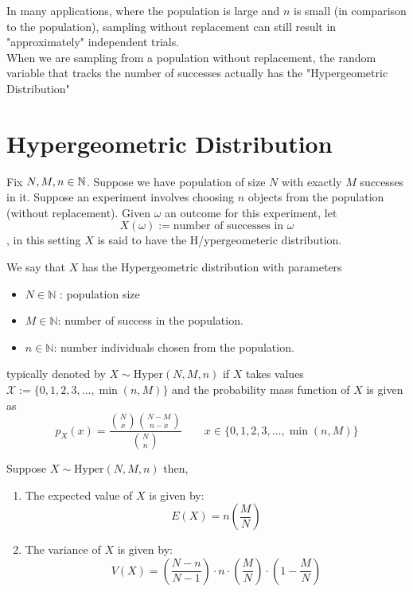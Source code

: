 In many applications, where the population is large and $n$ is small (in comparison to the population), sampling without replacement can still result in "approximately" independent trials.
\\

When we are sampling from a population without replacement, the random variable that tracks the number of successes actually has the "Hypergeometric Distribution"

\section{Hypergeometric Distribution}
Fix $N,M,n\in \mathbb{N}$. Suppose we have population of size $N$ with exactly $M$ successes in it. Suppose an experiment involves choosing $n$ objects from the population (without replacement). Given $\omega$ an outcome for this experiment, let
$$X(\omega) := \text{number of successes in $\omega$}$$, in this setting $X$ is said to have the H/ypergeometeric distribution.


\begin{defn}
    We say that $X$ has the Hypergeometric distribution with parameters
    \begin{itemize}
        \item $N\in \mathbb{N}$ : population size
        \item $M \in \mathbb{N}$: number of success in the population. 
        \item $n\in \mathbb{N}$: number individuals chosen from the population. 
    \end{itemize}
    typically denoted by $X \sim \text{Hyper}(N, M, n)$ if $X$ takes values $\mathcal{X}:= \{0,1, 2, 3, \dots, \min(n, M)\}$ and the probability mass function of $X$ is given as
    $$p_X(x) = \frac{{N \choose x} {N-M \choose n-x}}{{N \choose n}}\quad \quad x\in \{0,1, 2, 3, \dots, \min(n, M)\}$$
\end{defn}

\begin{thm}
    Suppose $X\sim \text{Hyper}(N, M, n)$ then,
    \begin{enumerate}
        \item The expected value of $X$ is given by:
        $$E(X) = n \left(\frac{M}{N}\right)$$
        \item The variance of $X$ is given by:
        $$V(X) = \left(\frac{N-n}{N-1} \right)\cdot n\cdot \left(\frac{M}{N}\right)\cdot \left(1-\frac{M}{N} \right) $$
    \end{enumerate}
\end{thm}

